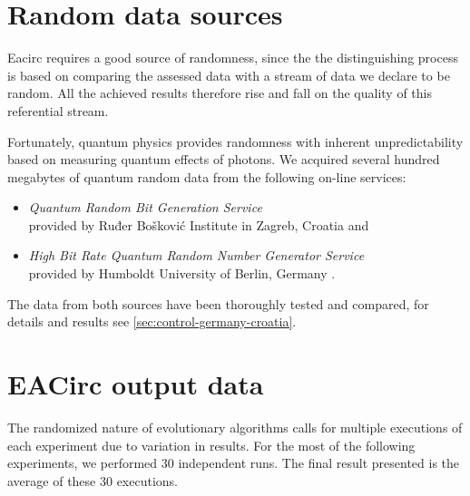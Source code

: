 \documentclass[12pt,oneside]{fithesis2}
\begin{document}
\section{Random data sources}
\label{sec:settings-random}

Eacirc requires a good source of randomness, since the the distinguishing process is based on comparing the assessed data
with a stream of data we declare to be random. All the achieved results therefore rise and fall 
on the quality of this referential stream.

Fortunately, quantum physics provides randomness with inherent unpredictability based on measuring quantum effects of photons. 
We acquired several hundred megabytes of quantum random data from the following on-line services:
\begin{itemize}
\item \textit{Quantum Random Bit Generation Service}\\
provided by Ruđer Bošković Institute in Zagreb, Croatia \cite{qrng-source-croatia} and
\item \textit{High Bit Rate Quantum Random Number Generator Service}\\
provided by Humboldt University of Berlin, Germany \cite{qrng-source-germany}.
\end{itemize}
The data from both sources have been thoroughly tested and compared, for details and results 
see \autoref{sec:control-germany-croatia}.

\section{EACirc output data}
\label{sec:settings-eacirc-output}

The randomized nature of evolutionary algorithms calls for multiple executions of each experiment due to variation in results.
For the most of the following experiments, we performed 30 independent runs. The final result presented is the average
of these 30 executions.
\end{document}

